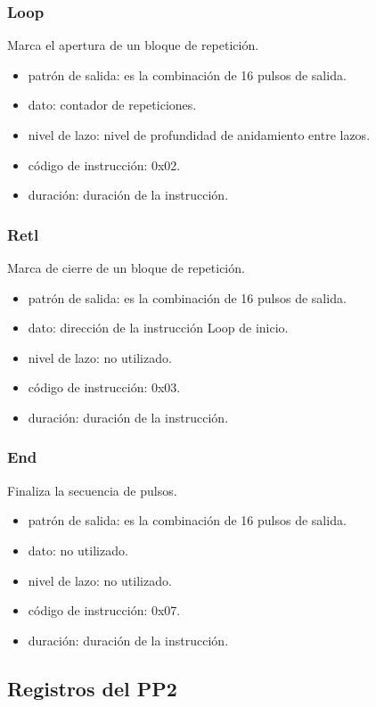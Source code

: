\subsubsection{Loop}
Marca el apertura de un bloque de repetici\'on.
\begin{itemize}
    \item patr\'on de salida: es la combinaci\'on de 16 pulsos de salida.
    \item dato: contador de repeticiones.
    \item nivel de lazo: nivel de profundidad de anidamiento entre lazos.
    \item c\'odigo de instrucci\'on: 0x02.
    \item duraci\'on: duraci\'on de la instrucci\'on.
\end{itemize}

\subsubsection{Retl}
Marca de cierre de un bloque de repetici\'on.
\begin{itemize}
    \item patr\'on de salida: es la combinaci\'on de 16 pulsos de salida.
    \item dato: direcci\'on de la instrucci\'on Loop de inicio.
    \item nivel de lazo: no utilizado.
    \item c\'odigo de instrucci\'on: 0x03.
    \item duraci\'on: duraci\'on de la instrucci\'on.
\end{itemize}

\subsubsection{End}
Finaliza la secuencia de pulsos.
\begin{itemize}
    \item patr\'on de salida: es la combinaci\'on de 16 pulsos de salida.
    \item dato: no utilizado.
    \item nivel de lazo: no utilizado.
    \item c\'odigo de instrucci\'on: 0x07.
    \item duraci\'on: duraci\'on de la instrucci\'on.
\end{itemize}

\subsection{Registros del PP2}

